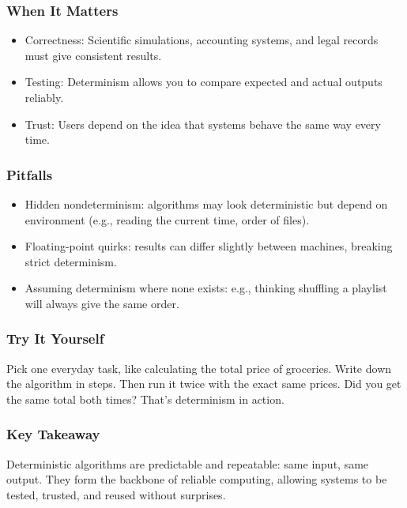 \documentclass[
  letterpaper,
  DIV=11,
  numbers=noendperiod]{scrreprt}
\providecommand{\tightlist}{%
  \setlength{\itemsep}{0pt}\setlength{\parskip}{0pt}}
\begin{document}
\subsubsection{When It Matters}\label{when-it-matters-18}

\begin{itemize}
\tightlist
\item
  Correctness: Scientific simulations, accounting systems, and legal
  records must give consistent results.
\item
  Testing: Determinism allows you to compare expected and actual outputs
  reliably.
\item
  Trust: Users depend on the idea that systems behave the same way every
  time.
\end{itemize}

\subsubsection{Pitfalls}\label{pitfalls-17}

\begin{itemize}
\tightlist
\item
  Hidden nondeterminism: algorithms may look deterministic but depend on
  environment (e.g., reading the current time, order of files).
\item
  Floating-point quirks: results can differ slightly between machines,
  breaking strict determinism.
\item
  Assuming determinism where none exists: e.g., thinking shuffling a
  playlist will always give the same order.
\end{itemize}

\subsubsection{Try It Yourself}\label{try-it-yourself-20}

Pick one everyday task, like calculating the total price of groceries.
Write down the algorithm in steps. Then run it twice with the exact same
prices. Did you get the same total both times? That's determinism in
action.

\subsubsection{Key Takeaway}\label{key-takeaway-19}

Deterministic algorithms are predictable and repeatable: same input,
same output. They form the backbone of reliable computing, allowing
systems to be tested, trusted, and reused without surprises.
\end{document}
